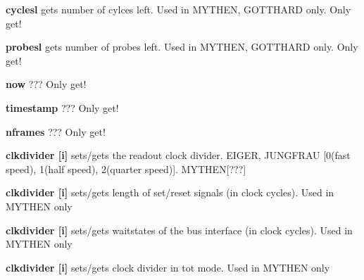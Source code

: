 \begin{DoxyItemize}
\item {\bfseries cyclesl} gets number of cylces left. Used in MYTHEN, GOTTHARD only. Only get!
\end{DoxyItemize}


\begin{DoxyItemize}
\item {\bfseries probesl} gets number of probes left. Used in MYTHEN, GOTTHARD only. Only get!
\end{DoxyItemize}


\begin{DoxyItemize}
\item {\bfseries now} ??? Only get!
\end{DoxyItemize}


\begin{DoxyItemize}
\item {\bfseries timestamp} ??? Only get!
\end{DoxyItemize}


\begin{DoxyItemize}
\item {\bfseries nframes} ??? Only get!
\end{DoxyItemize}


\begin{DoxyItemize}
\item {\bfseries clkdivider \mbox{[}i\mbox{]}} sets/gets the readout clock divider. EIGER, JUNGFRAU \mbox{[}0(fast speed), 1(half speed), 2(quarter speed)\mbox{]}. MYTHEN\mbox{[}???\mbox{]}
\end{DoxyItemize}


\begin{DoxyItemize}
\item {\bfseries clkdivider \mbox{[}i\mbox{]}} sets/gets length of set/reset signals (in clock cycles). Used in MYTHEN only
\end{DoxyItemize}


\begin{DoxyItemize}
\item {\bfseries clkdivider \mbox{[}i\mbox{]}} sets/gets waitstates of the bus interface (in clock cycles). Used in MYTHEN only
\end{DoxyItemize}


\begin{DoxyItemize}
\item {\bfseries clkdivider \mbox{[}i\mbox{]}} sets/gets clock divider in tot mode. Used in MYTHEN only
\end{DoxyItemize}


